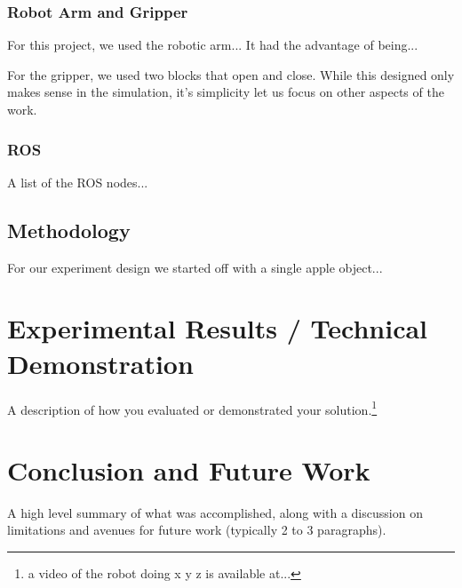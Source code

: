 \documentclass{article}
\begin{document}
\subsubsection{Robot Arm and Gripper}

For this project, we used the robotic arm...
It had the advantage of being...

For the gripper, we used two blocks that open and close. While this designed only makes sense in the simulation, it's simplicity let us focus on other aspects of the work.

\subsubsection{ROS}

A list of the ROS nodes...

\subsection{Methodology}

For our experiment design we started off with a single apple object...


\section{Experimental Results / Technical Demonstration}

A description of how you evaluated or demonstrated your solution.\footnote{a video of the robot doing x y z is available at...} 



\section{Conclusion and Future Work}

A high level summary of what was accomplished, along with a discussion on limitations and avenues for future work (typically 2 to 3 paragraphs). 






\end{document}
